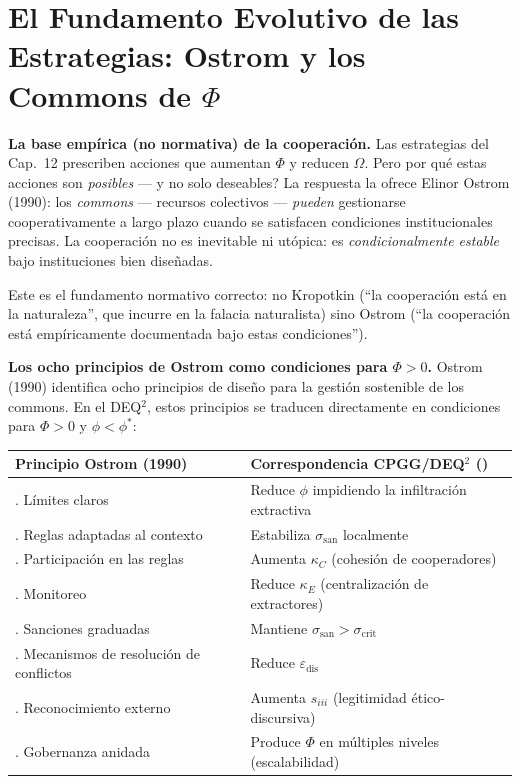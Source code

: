 \section{El Fundamento Evolutivo de las Estrategias: Ostrom y los Commons de \(\Phi\)}\label{il-fondamento-evolutivo-delle-strategie}

\Proved{} \textbf{La base emp\'{i}rica (no normativa) de la cooperaci\'{o}n.}
Las estrategias del Cap.~12 prescriben acciones que aumentan $\Phi$ y
reducen $\Omega$. Pero \textquestiondown por qu\'{e} estas acciones son
\emph{posibles} --- y no solo deseables? La respuesta la ofrece Elinor
Ostrom (1990): los \emph{commons} --- recursos colectivos --- \emph{pueden}
gestionarse cooperativamente a largo plazo cuando se satisfacen condiciones
institucionales precisas. La cooperaci\'{o}n no es inevitable ni
ut\'{o}pica: es \emph{condicionalmente estable} bajo instituciones bien
dise\~{n}adas.

Este es el fundamento normativo correcto: no Kropotkin (``la cooperaci\'{o}n
est\'{a} en la naturaleza'', que incurre en la falacia naturalista) sino
Ostrom (``la cooperaci\'{o}n est\'{a} emp\'{i}ricamente documentada bajo
estas condiciones'').

\Hypoth{} \textbf{Los ocho principios de Ostrom como condiciones para
\(\Phi > 0\).} Ostrom (1990) identifica ocho principios de dise\~{n}o para
la gesti\'{o}n sostenible de los commons. En el DEQ$^2$, estos principios
se traducen directamente en condiciones para $\Phi > 0$ y $\phi < \phi^*$:

{\def\LTcaptype{none}
{\small\begin{longtable}[]{@{}
  >{\raggedright\arraybackslash}p{}
  >{\raggedright\arraybackslash}p{}@{}}
\toprule\noalign{}
\begin{minipage}[b]{\linewidth}\raggedright
Principio Ostrom (1990)
\end{minipage} & \begin{minipage}[b]{\linewidth}\raggedright
Correspondencia CPGG/DEQ$^2$ (\Hypoth{})
\end{minipage} \\
\midrule\noalign{}
\endhead
\bottomrule\noalign{}
\endlastfoot
1. L\'{i}mites claros & Reduce $\phi$ impidiendo la infiltraci\'{o}n extractiva \\
2. Reglas adaptadas al contexto & Estabiliza $\sigma_{\text{san}}$ localmente \\
3. Participaci\'{o}n en las reglas & Aumenta $\kappa_C$ (cohesi\'{o}n de cooperadores) \\
4. Monitoreo & Reduce $\kappa_E$ (centralizaci\'{o}n de extractores) \\
5. Sanciones graduadas & Mantiene $\sigma_{\text{san}} > \sigma_{\text{crit}}$ \\
6. Mecanismos de resoluci\'{o}n de conflictos & Reduce $\varepsilon_{\text{dis}}$ \\
7. Reconocimiento externo & Aumenta $s_{iii}$ (legitimidad \'{e}tico-discursiva) \\
8. Gobernanza anidada & Produce $\Phi$ en m\'{u}ltiples niveles (escalabilidad) \\
\end{longtable}}
}

